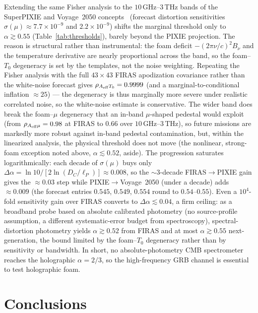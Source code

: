 \documentclass[aps,prd,onecolumn,amsmath,amssymb]{revtex4-2}
\begin{document}
Extending the same Fisher analysis to the $10$\,GHz--$3$\,THz bands of
the SuperPIXIE and Voyage~2050 concepts~\cite{Chluba2021} (forecast
distortion sensitivities $\sigma(\mu)\approx 7.7\times10^{-9}$ and
$2.2\times10^{-9}$) shifts the marginal threshold only to $\alpha\gtrsim 0.55$
(Table~\ref{tab:thresholds}), barely beyond the
PIXIE projection.  The reason is structural rather than instrumental:
the foam deficit $-(2\pi\nu/c)^2 B_\nu$ and the temperature derivative are
nearly proportional across the band, so the foam--$T_0$ degeneracy is set
by the templates, not the noise weighting.  Repeating the Fisher analysis
with the full $43\times43$ FIRAS apodization covariance rather than the
white-noise forecast gives $\rho_{A_{\rm eff}T_0}=0.9999$ (and a
marginal-to-conditional inflation $\approx25$) --- the degeneracy is thus
marginally more severe under realistic correlated noise, so the white-noise
estimate is conservative.  The
wider band does break the foam--$\mu$ degeneracy that an in-band
$\mu$-shaped pedestal would exploit (from
$\rho_{A_{\rm eff}\mu}=0.98$ at FIRAS to $0.66$ over
$10$\,GHz--$3$\,THz), so future missions are markedly more robust
against in-band pedestal contamination, but, within the linearized
analysis, the physical threshold does not move (the nonlinear,
strong-foam exception noted above, $\alpha\lesssim0.52$, aside).  The
progression saturates logarithmically: each decade of $\sigma(\mu)$ buys
only $\Delta\alpha=\ln10/[2\ln(D_C/\ell_P)]\approx0.008$, so the
$\sim\!3$-decade FIRAS$\to$PIXIE gain gives the $\approx0.03$ step while
PIXIE$\to$Voyage~2050 (under a decade) adds $\approx0.009$ (the forecast
entries $0.545$, $0.549$, $0.554$ round to $0.54$--$0.55$).  Even a
$10^{4}$-fold sensitivity gain over FIRAS converts to
$\Delta\alpha\lesssim0.04$, a firm ceiling: as a broadband probe based on
absolute calibrated photometry (no source-profile assumption, a different
systematic-error budget from spectroscopy), spectral-distortion
photometry yields $\alpha\gtrsim0.52$ from FIRAS and at most
$\alpha\gtrsim0.55$ next-generation, the bound limited by the
foam--$T_0$ degeneracy rather than by sensitivity or bandwidth.
In short, no absolute-photometry CMB spectrometer reaches the holographic
$\alpha=2/3$, so the high-frequency GRB channel is essential
to test holographic foam.

\section{Conclusions}
\label{sec:conclusions}
\end{document}
